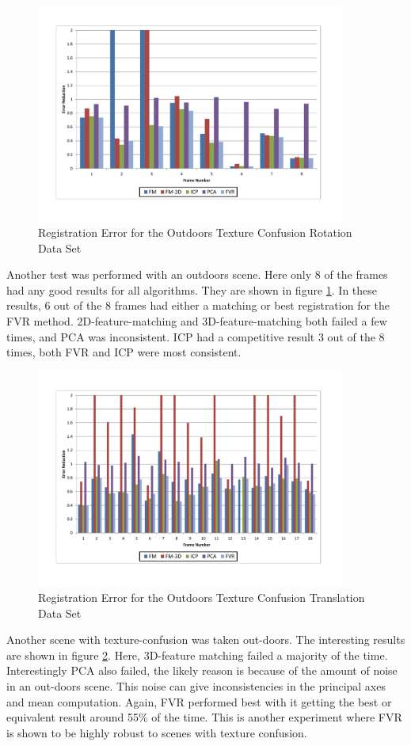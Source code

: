 \begin{figure}[!htb]
\centering
\includegraphics[width=4.0in]{images/results/Outside_TextureConfusion_Rotation}
\caption{Registration Error for the Outdoors Texture Confusion Rotation Data Set}
\label{fig:PET15}
\end{figure}

Another test was performed with an outdoors scene. Here only 8 of the frames had any good results for all algorithms. They are shown in figure \ref{fig:PET15}. In these results, 6 out of the 8 frames had either a matching or best registration for the FVR method. 2D-feature-matching and 3D-feature-matching both failed a few times, and PCA was inconsistent. ICP had a competitive result 3 out of the 8 times, both FVR and ICP were most consistent. 

\begin{figure}[!htb]
\centering
\includegraphics[width=4.0in]{images/results/Outside_TextureConfusion_Translation}
\caption{Registration Error for the Outdoors Texture Confusion Translation Data Set}
\label{fig:PET16}
\end{figure}

Another scene with texture-confusion was taken out-doors. The interesting results are shown in figure \ref{fig:PET16}. Here, 3D-feature matching failed a majority of the time. Interestingly PCA also failed, the likely reason is because of the amount of noise in an out-doors scene. This noise can give inconsistencies in the principal axes and mean computation. Again, FVR performed best with it getting the best or equivalent result around 55\% of the time. This is another experiment where FVR is shown to be highly robust to scenes with texture confusion. 

